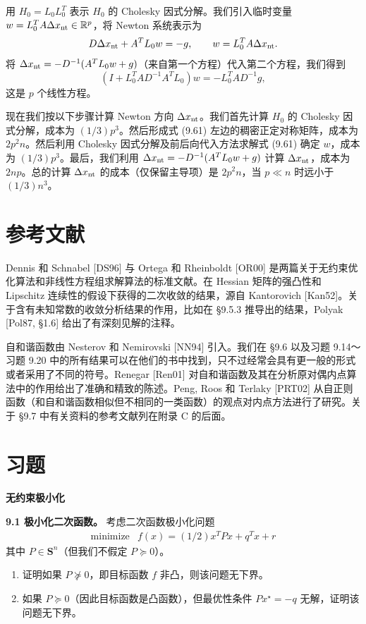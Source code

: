 \documentclass[UTF8, 12pt, fontset=fandol, oneside]{ctexart}
\begin{document}
用 $H_0=L_0L_0^T$ 表示 $H_0$ 的 Cholesky 因式分解。我们引入临时变量 $w=L_0^TA\Delta x_{\rm nt}\in\mathbb{R}^p$，将 Newton 系统表示为
\[
D\Delta x_{\rm nt}+A^TL_0w=-g,\qquad w=L_0^TA\Delta x_{\rm nt}.
\]
将 $\Delta x_{\rm nt}=-D^{-1}(A^TL_0w+g)$（来自第一个方程）代入第二个方程，我们得到
\begin{equation}
(I+L_0^TAD^{-1}A^TL_0)w=-L_0^TAD^{-1}g,
\tag{9.61}
\end{equation}
这是 $p$ 个线性方程。

现在我们按以下步骤计算 Newton 方向 $\Delta x_{\rm nt}$。我们首先计算 $H_0$ 的 Cholesky 因式分解，成本为 $(1/3)p^3$。然后形成式 (9.61) 左边的稠密正定对称矩阵，成本为 $2p^2n$。然后利用 Cholesky 因式分解及前后向代入方法求解式 (9.61) 确定 $w$，成本为 $(1/3)p^3$。最后，我们利用 $\Delta x_{\rm nt}=-D^{-1}(A^TL_0w+g)$ 计算 $\Delta x_{\rm nt}$，成本为 $2np$。总的计算 $\Delta x_{\rm nt}$ 的成本（仅保留主导项）是 $2p^2n$，当 $p\ll n$ 时远小于 $(1/3)n^3$。

\section*{参考文献}

Dennis 和 Schnabel [DS96] 与 Ortega 和 Rheinboldt [OR00] 是两篇关于无约束优化算法和非线性方程组求解算法的标准文献。在 Hessian 矩阵的强凸性和 Lipschitz 连续性的假设下获得的二次收敛的结果，源自 Kantorovich [Kan52]。关于含有未知常数的收敛分析结果的作用，比如在 \S9.5.3 推导出的结果，Polyak [Pol87, \S1.6] 给出了有深刻见解的注释。

自和谐函数由 Nesterov 和 Nemirovski [NN94] 引入。我们在 \S9.6 以及习题 9.14～习题 9.20 中的所有结果可以在他们的书中找到，只不过经常会具有更一般的形式或者采用了不同的符号。Renegar [Ren01] 对自和谐函数及其在分析原对偶内点算法中的作用给出了准确和精致的陈述。Peng, Roos 和 Terlaky [PRT02] 从自正则函数（和自和谐函数相似但不相同的一类函数）的观点对内点方法进行了研究。关于 \S9.7 中有关资料的参考文献列在附录 C 的后面。

\section*{习题}

\noindent\textbf{无约束极小化}

\noindent\textbf{9.1 极小化二次函数。}\quad
考虑二次函数极小化问题
\[
\begin{array}{ll}
\mbox{minimize} & f(x)=(1/2)x^TPx+q^Tx+r
\end{array}
\]
其中 $P\in\mathbf{S}^n$（但我们不假定 $P\succeq0$）。
\begin{enumerate}
\item[(a)] 证明如果 $P\nsucceq0$，即目标函数 $f$ 非凸，则该问题无下界。
\item[(b)] 如果 $P\succeq0$（因此目标函数是凸函数），但最优性条件 $Px^\star=-q$ 无解，证明该问题无下界。
\end{enumerate}
\end{document}
